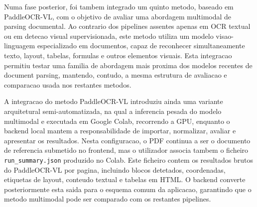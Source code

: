 

Numa fase posterior, foi tambem integrado um quinto metodo, baseado em
PaddleOCR-VL, com o objetivo de avaliar uma abordagem multimodal de parsing
documental. Ao contrario dos pipelines assentes apenas em OCR textual ou em
detecao visual supervisionada, este metodo utiliza um modelo visao-linguagem
especializado em documentos, capaz de reconhecer simultaneamente texto, layout,
tabelas, formulas e outros elementos visuais. Esta integracao permitiu testar
uma familia de abordagem mais proxima dos modelos recentes de document parsing,
mantendo, contudo, a mesma estrutura de avaliacao e comparacao usada nos
restantes metodos.


A integracao do metodo PaddleOCR-VL introduziu ainda uma variante arquitetural
semi-automatizada, na qual a inferencia pesada do modelo multimodal e executada
em Google Colab, recorrendo a GPU, enquanto o backend local mantem a
responsabilidade de importar, normalizar, avaliar e apresentar os resultados.
Nesta configuracao, o PDF continua a ser o documento de referencia submetido no
frontend, mas o utilizador associa tambem o ficheiro \texttt{run\_summary.json}
produzido no Colab. Este ficheiro contem os resultados brutos do PaddleOCR-VL
por pagina, incluindo blocos detetados, coordenadas, etiquetas de layout,
conteudo textual e tabelas em HTML. O backend converte posteriormente esta saida
para o esquema comum da aplicacao, garantindo que o metodo multimodal pode ser
comparado com os restantes pipelines.


